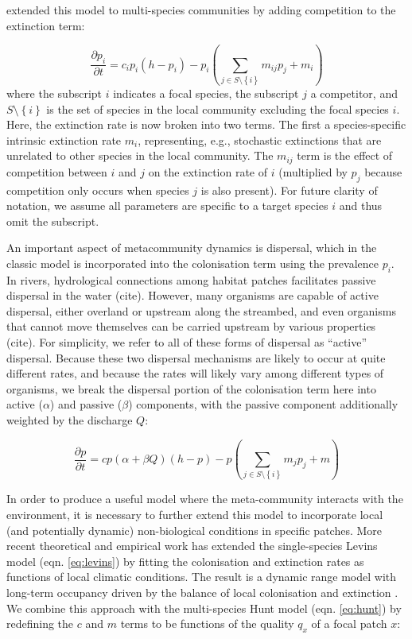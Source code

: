\documentclass[11pt,a4paper]{article}
\begin{document}
\textcite{Hunt2009} extended this model to multi-species communities by adding competition to the extinction term:

\begin{equation}
	\frac{\partial p_i}{\partial t} = c_i p_i \left( h-p_i \right) - p_i \left( \sum_{j \in S \setminus \left\{i \right\} }{m_{ij}p_j} + m_i \right) \label{eq:hunt}
\end{equation}
where the subscript $i$ indicates a focal species, the subscript $j$ a competitor, and $S \setminus \left\{i \right\}$ is the set of species in the local community excluding the focal species $i$.
Here, the extinction rate is now broken into two terms.
The first a species-specific intrinsic extinction rate $m_i$, representing, e.g., stochastic extinctions that are unrelated to other species in the local community.
The $m_{ij}$ term is the effect of competition between $i$ and $j$ on the extinction rate of $i$ (multiplied by $p_j$ because competition only occurs when species $j$ is also present).
For future clarity of notation, we assume all parameters are specific to a target species $i$ and thus omit the subscript.

An important aspect of metacommunity dynamics is dispersal, which in the classic model is incorporated into the colonisation term using the prevalence $p_i$.
In rivers, hydrological connections among habitat patches facilitates passive dispersal in the water (cite).
However, many organisms are capable of active dispersal, either overland or upstream along the streambed, and even organisms that cannot move themselves can be carried upstream by various properties (cite).
For simplicity, we refer to all of these forms of dispersal as “active” dispersal.
Because these two dispersal mechanisms are likely to occur at quite different rates, and because the rates will likely vary among different types of organisms, we break the dispersal portion of the colonisation term here into active ($\alpha$) and passive ($\beta$) components, with the passive component additionally weighted by the discharge $Q$:

\begin{equation}
	\frac{\partial p}{\partial t} = c p(\alpha + \beta Q) \left( h-p \right) - p \left( \sum_{j \in S \setminus \left\{i \right\} }{m_{j}p_j} + m \right)
	\label{eq:metacom}
\end{equation}

In order to produce a useful model where the meta-community interacts with the environment, it is necessary to further extend this model to incorporate local (and potentially dynamic) non-biological conditions in specific patches.
More recent theoretical \autocite{Holt2000,Holt2005} and empirical \autocite{Talluto2017} work has extended the single-species Levins model (eqn. \ref{eq:levins}) by fitting the colonisation and extinction rates as functions of local climatic conditions.
The result is a dynamic range model with long-term occupancy driven by the balance of local colonisation and extinction \autocite{Talluto2017}.
We combine this approach with the multi-species Hunt model (eqn. \ref{eq:hunt}) by redefining the $c$ and $m$ terms to be functions of the quality $q_x$ of a focal patch $x$:
\end{document}
